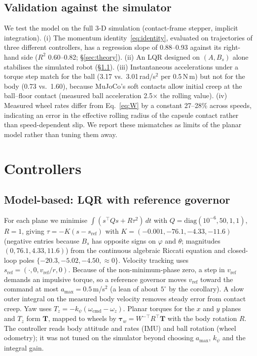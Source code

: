 \documentclass[conference]{IEEEtran}
\theoremstyle{remark}
\begin{document}
\subsection{Validation against the simulator}
We test the model on the full 3-D simulation (contact-frame stepper, implicit integration). (i) The momentum identity~\eqref{eq:identity}, evaluated on trajectories of three different controllers, has a regression slope of 0.88--0.93 against its right-hand side ($R^2$ 0.60--0.82; \S\ref{sec:theory}). (ii) An LQR designed on $(A,B_s)$ alone stabilises the simulated robot (\S\ref{sec:lqr}). (iii) Instantaneous accelerations under a torque step match for the ball (3.17 vs.\ 3.01\,rad/s$^2$ per 0.5\,N\,m) but not for the body (0.73 vs.\ 1.60), because MuJoCo's soft contacts allow initial creep at the ball--floor contact (measured ball acceleration 2.5$\times$ the rolling value). (iv) Measured wheel rates differ from Eq.~\eqref{eq:W} by a constant 27--28\% across speeds, indicating an error in the effective rolling radius of the capsule contact rather than speed-dependent slip. We report these mismatches as limits of the planar model rather than tuning them away.

\section{Controllers}\label{sec:ctrl}
\subsection{Model-based: LQR with reference governor}\label{sec:lqr}
For each plane we minimise $\int (s^\top Qs+R\tau^2)\,dt$ with $Q=\mathrm{diag}(10^{-6},50,1,1)$, $R=1$, giving $\tau=-K(s-s_{\mathrm{ref}})$ with $K=(-0.001,-76.1,-4.33,-11.6)$ (negative entries because $B_s$ has opposite signs on $\varphi$ and $\theta$; magnitudes $(0,76.1,4.33,11.6)$) from the continuous algebraic Riccati equation and closed-loop poles $\{-20.3,-5.02,-4.50,\approx0\}$. Velocity tracking uses $s_{\mathrm{ref}}=(\cdot,0,v_{\mathrm{ref}}/r,0)$. Because of the non-minimum-phase zero, a step in $v_{\mathrm{ref}}$ demands an impulsive torque, so a reference governor moves $v_{\mathrm{ref}}$ toward the command at most $a_{\max}=0.5$\,m/s$^2$ (a lean of about $5^\circ$ by the corollary). A slow outer integral on the measured body velocity removes steady error from contact creep. Yaw uses $T_z=-k_\psi(\omega_{\mathrm{cmd}}-\omega_z)$. Planar torques for the $x$ and $y$ planes and $T_z$ form $\bm T$, mapped to wheels by $\bm\tau_w=W^{-\top}R^\top\bm T$ with the body rotation $R$. The controller reads body attitude and rates (IMU) and ball rotation (wheel odometry); it was not tuned on the simulator beyond choosing $a_{\max}$, $k_\psi$ and the integral gain.
\end{document}
